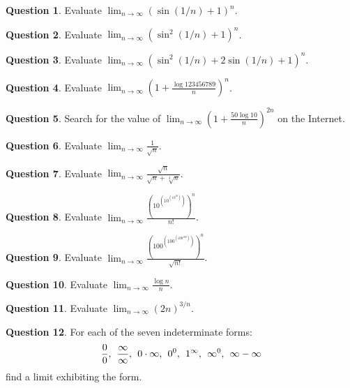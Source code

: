 \documentclass[12pt]{article}
\theoremstyle{definition}
\newtheorem{question}{Question}
\newcommand{\limn}{\displaystyle\lim_{n \to \infty}}
\begin{document}
\begin{question}
Evaluate $\limn \left(\sin (1/n) + 1\right)^n$.
\end{question}

\begin{question}
Evaluate $\limn \left(\sin^2 (1/n) + 1\right)^n$.
\end{question}

\begin{question}
Evaluate $\limn \left(\sin^2 (1/n) + 2 \sin (1/n) + 1\right)^n$.
\end{question}

\begin{question}
Evaluate $\limn \left( 1 + \frac{\log 123456789}{n} \right)^n$.
\end{question}

\begin{question}
Search for the value of $\limn \left( 1 + \frac{50 \log 10}{n} \right)^{2n}$ on the Internet.
\end{question}

\begin{question}
Evaluate $\limn \frac{1}{\sqrt{n}}$.
\end{question}

\begin{question}
Evaluate $\limn \frac{\sqrt{n}}{\sqrt{n} + \sqrt[3]{n}}$.
\end{question}

\begin{question}
Evaluate $\limn \frac{ \left(10^{\left(10^{\left( 10^{10} \right)}\right)}\right)^n }{n!}$.
\end{question}

\begin{question}
Evaluate $\limn \frac{ \left(100^{\left(100^{\left( 100^{100} \right)}\right)}\right)^n }{\sqrt{n!}}$.
\end{question}

\begin{question}
Evaluate $\limn \displaystyle\frac{\log n}{n}$.
\end{question}

\begin{question}
Evaluate $\limn (2n)^{3/n}$.
\end{question}

\begin{question}
For each of the seven indeterminate forms:
$$ \displaystyle\frac{0}{0},\hspace{1ex}
 \displaystyle\frac{\infty}{\infty},\hspace{1ex}
0 \cdot \infty,\hspace{1ex}
 0^0,\hspace{1ex}
 1^\infty,\hspace{1ex}
 \infty^0,\hspace{1ex}
 \infty - \infty
$$
find a limit exhibiting the form.
\end{question}
\end{document}
